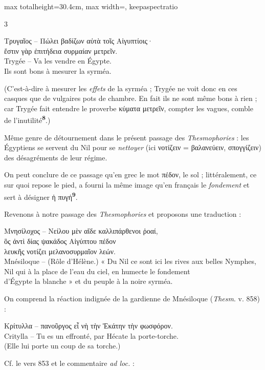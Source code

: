 \documentclass[11pt,twoside]{book}
\newcommand{\italique}[1]{\textit{#1}}
\newcommand{\citComm}[1]{\begin{quoting}[vskip=0.4pt,leftmargin=0.7em,rightmargin=0.2em]#1\end{quoting}}
\newcommand{\marqueur}[1]{\textsuperscript{\color{rubricRed}\textbf{#1}}}
\begin{document}
\begin{adjustbox}{max totalheight=30.4cm, max width=\textwidth, keepaspectratio}
\begin{minipage}{\textwidth}
{\begin{multicols}{3}
\citComm{Τρυγαῖος – Πώλει βαδίζων αὐτὰ τοῖς Αἰγυπτίοις·\\
ἔστιν γὰρ ἐπιτήδεια συρμαίαν μετρεῖν.\\
Trygée – Va les vendre en Égypte.\\
Ils sont bons à mesurer la syrméa.}
\par\vspace{1.5pt}
\noindent (C'est-à-dire à mesurer les \italique{effets} de la syrméa ; Trygée ne voit donc en ces casques que de vulgaires pots de chambre. En fait ils ne sont même bons à rien ; car Trygée fait entendre le proverbe κύματα μετρεῖν, compter les vagues, comble de l'inutilité\marqueur{8}.)
\par\vspace{1.5pt}
\noindent Même genre de détournement dans le présent passage des \italique{Thesmophories} : les Égyptiens se servent du Nil pour se \italique{nettoyer} (ici νοτίζειν = βαλανεύειν, σπογγίζειν) des désagréments de leur régime.
\par\vspace{1.5pt}
\noindent On peut conclure de ce passage qu'en grec le mot πέδον, le sol ; littéralement, ce sur quoi repose le pied, a fourni la même image qu'en français le \italique{fondement} et sert à désigner ἡ πυγή\marqueur{9}.
\par\vspace{1.5pt}
\noindent Revenons à notre passage des \italique{Thesmophories} et proposons une traduction :
\citComm{Μνησίλοχος – Νείλου μὲν αἵδε καλλιπάρθενοι ῥοαί,\\
ὃς ἀντὶ δίας ψακάδος Αἰγύπτου πέδον\\
λευκῆς νοτίζει μελανοσυρμαῖον λεών.\\
Mnésiloque – (Rôle d'Hélène.) « Du Nil ce sont ici les rives aux belles Nymphes,\\
Nil qui à la place de l'eau du ciel, en humecte le fondement\\
d'Égypte la blanche » et du peuple à la noire syrméa.}
\par\vspace{1.5pt}
\noindent On comprend la réaction indignée de la gardienne de Mnésiloque (\italique{Thesm}. v. 858) :
\citComm{Κρίτυλλα – πανοῦργος εἶ νὴ τὴν Ἑκάτην τὴν φωσφόρον.\\
Critylla – Tu es un effronté, par Hécate la porte-torche.\\
(Elle lui porte un coup de sa torche.)}
\par\vspace{1.5pt}
\noindent Cf. le vers 853 et le commentaire \italique{ad loc.} :

\end{multicols}}
\end{minipage}
\end{adjustbox}
\end{document}
